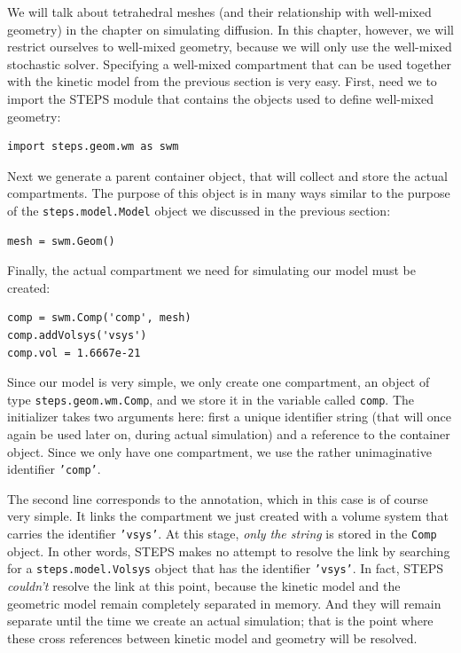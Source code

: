 \documentclass[a4paper,12pt]{book}
\begin{document}
We will talk about tetrahedral meshes (and their relationship with well-mixed geometry) in the chapter on simulating diffusion. In this chapter, however, we will restrict ourselves to well-mixed geometry, because we will only use the well-mixed stochastic solver. Specifying a well-mixed compartment that can be used together with the kinetic model from the previous section is very easy. First, need we to import the STEPS module that contains the objects used to define well-mixed geometry:

\begin{verbatim}
import steps.geom.wm as swm
\end{verbatim}

Next we generate a parent container object, that will collect and store the actual compartments. The purpose of this object is in many ways similar to the purpose of the \texttt{steps.model.Model} object we discussed in the previous section:
\begin{verbatim}
mesh = swm.Geom()
\end{verbatim}

Finally, the actual compartment we need for simulating our model must be created:

\begin{verbatim}
comp = swm.Comp('comp', mesh)
comp.addVolsys('vsys')
comp.vol = 1.6667e-21
\end{verbatim}

Since our model is very simple, we only create one compartment, an object of type \texttt{steps.geom.wm.Comp}, and we store it in the variable called \texttt{comp}. The initializer takes two arguments here: first a unique identifier string (that will once again be used later on, during actual simulation) and a reference to the container object. Since we only have one compartment, we use the rather unimaginative identifier \texttt{'comp'}.

The second line corresponds to the annotation, which in this case is of course very simple. It links the compartment we just created with a volume system that carries the identifier \texttt{'vsys'}. At this stage, \emph{only the string} is stored in the \texttt{Comp} object. In other words, STEPS makes no attempt to resolve the link by searching for a \texttt{steps.model.Volsys} object that has the identifier \texttt{'vsys'}. In fact, STEPS \emph{couldn't} resolve the link at this point, because the kinetic model and the geometric model remain completely separated in memory. And they will remain separate until the time we create an actual simulation; that is the point where these cross references between kinetic model and geometry will be resolved. 
\end{document}
